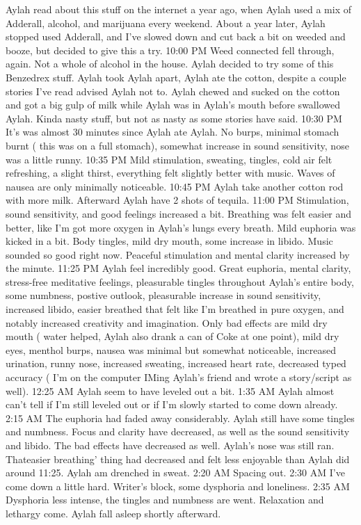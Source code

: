 \documentclass[12pt]{book}
\begin{document}
Aylah read about this stuff on the internet a year ago, when Aylah used a mix of Adderall, alcohol, and marijuana every weekend. About a year later, Aylah stopped used Adderall, and I've slowed down and cut back a bit on weeded and booze, but decided to give this a try. 10:00 PM Weed connected fell through, again. Not a whole of alcohol in the house. Aylah decided to try some of this Benzedrex stuff. Aylah took Aylah apart, Aylah ate the cotton, despite a couple stories I've read advised Aylah not to. Aylah chewed and sucked on the cotton and got a big gulp of milk while Aylah was in Aylah's mouth before swallowed Aylah. Kinda nasty stuff, but not as nasty as some stories have said. 10:30 PM It's was almost 30 minutes since Aylah ate Aylah. No burps, minimal stomach burnt ( this was on a full stomach), somewhat increase in sound sensitivity, nose was a little runny. 10:35 PM Mild stimulation, sweating, tingles, cold air felt refreshing, a slight thirst, everything felt slightly better with music. Waves of nausea are only minimally noticeable. 10:45 PM Aylah take another cotton rod with more milk. Afterward Aylah have 2 shots of tequila. 11:00 PM Stimulation, sound sensitivity, and good feelings increased a bit. Breathing was felt easier and better, like I'm got more oxygen in Aylah's lungs every breath. Mild euphoria was kicked in a bit. Body tingles, mild dry mouth, some increase in libido. Music sounded so good right now. Peaceful stimulation and mental clarity increased by the minute. 11:25 PM Aylah feel incredibly good. Great euphoria, mental clarity, stress-free meditative feelings, pleasurable tingles throughout Aylah's entire body, some numbness, postive outlook, pleasurable increase in sound sensitivity, increased libido, easier breathed that felt like I'm breathed in pure oxygen, and notably increased creativity and imagination. Only bad effects are mild dry mouth ( water helped, Aylah also drank a can of Coke at one point), mild dry eyes, menthol burps, nausea was minimal but somewhat noticeable, increased urination, runny nose, increased sweating, increased heart rate, decreased typed accuracy ( I'm on the computer IMing Aylah's friend and wrote a story/script as well). 12:25 AM Aylah seem to have leveled out a bit. 1:35 AM Aylah almost can't tell if I'm still leveled out or if I'm slowly started to come down already. 2:15 AM The euphoria had faded away considerably. Aylah still have some tingles and numbness. Focus and clarity have decreased, as well as the sound sensitivity and libido. The bad effects have decreased as well. Aylah's nose was still ran. Thateasier breathing' thing had decreased and felt less enjoyable than Aylah did around 11:25. Aylah am drenched in sweat. 2:20 AM Spacing out. 2:30 AM I've come down a little hard. Writer's block, some dysphoria and loneliness. 2:35 AM Dysphoria less intense, the tingles and numbness are went. Relaxation and lethargy come. Aylah fall asleep shortly afterward.
\end{document}
